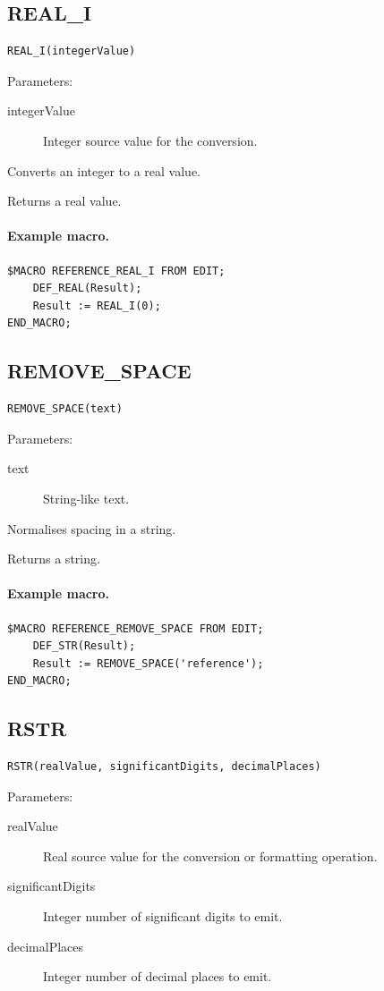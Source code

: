 \documentclass[a4paper,10pt,twoside,openany]{book}
\begin{document}
\label{prim:intrinsic-real-i}
\subsection*{REAL\_I}
\begin{verbatim}
REAL_I(integerValue)
\end{verbatim}
Parameters:
\begin{description}
\item[integerValue] Integer source value for the conversion.
\end{description}

Converts an integer to a real value.

Returns a real value.

\paragraph{Example macro.}
\begin{verbatim}
$MACRO REFERENCE_REAL_I FROM EDIT;
    DEF_REAL(Result);
    Result := REAL_I(0);
END_MACRO;
\end{verbatim}

\label{prim:intrinsic-remove-space}
\subsection*{REMOVE\_SPACE}
\begin{verbatim}
REMOVE_SPACE(text)
\end{verbatim}
Parameters:
\begin{description}
\item[text] String-like text.
\end{description}

Normalises spacing in a string.

Returns a string.

\paragraph{Example macro.}
\begin{verbatim}
$MACRO REFERENCE_REMOVE_SPACE FROM EDIT;
    DEF_STR(Result);
    Result := REMOVE_SPACE('reference');
END_MACRO;
\end{verbatim}

\label{prim:intrinsic-rstr}
\subsection*{RSTR}
\begin{verbatim}
RSTR(realValue, significantDigits, decimalPlaces)
\end{verbatim}
Parameters:
\begin{description}
\item[realValue] Real source value for the conversion or formatting operation.
\item[significantDigits] Integer number of significant digits to emit.
\item[decimalPlaces] Integer number of decimal places to emit.
\end{description}
\end{document}
